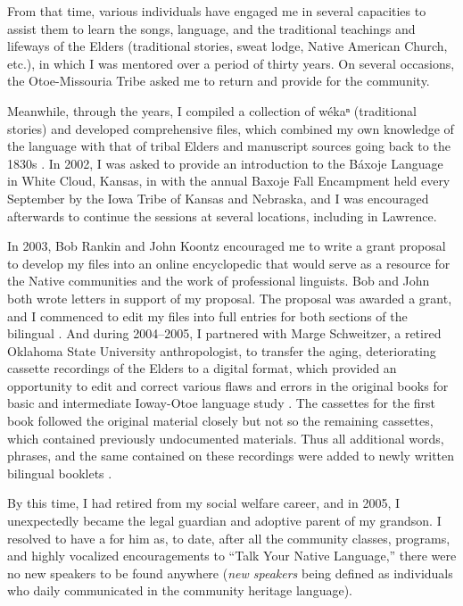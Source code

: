 \documentclass[output=paper]{LSP/langsci}
\begin{document}
From that time, various individuals have engaged me in several capacities to assist them to learn the songs, language, and the traditional teachings and lifeways of the Elders (traditional stories, sweat lodge, Native American Church, etc.), in which I was mentored over a period of thirty years. On several occasions, the Otoe-Missouria Tribe asked me to return and provide  for the community.  

Meanwhile, through the years, I compiled a collection of wékaⁿ (traditional stories) and developed comprehensive  files, which combined my own knowledge of the language with that of tribal Elders and manuscript sources going back to the 1830s \citep{Goodtracks1992}. In 2002, I was asked to provide an introduction to the Báxoje Language in White Cloud, Kansas, in  with the annual Baxoje Fall Encampment held every September by the Iowa Tribe of Kansas and Nebraska, and I was encouraged afterwards to continue the sessions at several locations, including in Lawrence. 

In 2003, Bob Rankin and John Koontz encouraged me to write a grant proposal to develop my  files into an online encyclopedic  that would serve as a resource for the Native communities and the work of professional linguists. Bob and John both wrote letters in support of my proposal. The proposal was awarded a grant, and I commenced to edit my files into full entries for both sections of the bilingual . And during 2004--2005, I partnered with Marge Schweitzer, a retired Oklahoma State University anthropologist, to transfer the aging, deteriorating cassette recordings of the Elders to a digital format, which provided an opportunity to edit and correct various flaws and errors in the original books for basic and intermediate Ioway-Otoe language study \citep{OtoeIowaWistrandRobinson1977, OtoeIowaWistrandRobinson1978}. The cassettes for the first book followed the original material closely but not so the remaining cassettes, which contained previously undocumented materials. Thus all additional words, phrases, and the same contained on these recordings were added to newly written bilingual booklets \citep{Goodtracks2004a, Goodtracks2004b}.

By this time, I had retired from my social welfare career, and in 2005, I unexpectedly became the legal guardian and adoptive parent of my grandson. I resolved to have a  for him as, to date, after all the community classes, programs, and highly vocalized encouragements to ``Talk Your Native Language,'' there were no new speakers to be found anywhere (\emph{new speakers} being defined as individuals who daily communicated in the community heritage language).  
\end{document}
